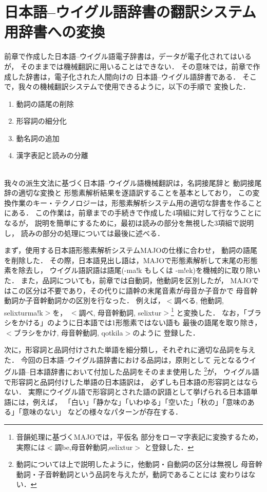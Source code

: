 {\section{日本語--ウイグル語辞書の翻訳システム用辞書への変換}\label{section:for_majo}
前章で作成した日本語--ウイグル語電子辞書は，データが電子化されてはいるが，
そのままでは機械翻訳に用いることはできない．
その意味では，前章で作成した辞書は，電子化された人間向けの
日本語--ウイグル語辞書である．
そこで，我々の機械翻訳システムで使用できるように，以下の手順で
変換した．\\

\begin{enumerate}
 \item 動詞の語尾の削除
 \item 形容詞の細分化
 \item 動名詞の追加
 \item 漢字表記と読みの分離
\end{enumerate} \mbox{} \\

我々の派生文法に基づく日本語--ウイグル語機械翻訳\cite{MT_SUMMIT2001}は，名詞接尾辞と
動詞接尾辞の適切な変換\cite{MUH_OGA2001,MAJO}と
形態素解析結果を逐語訳することを基本としており，
この変換作業のキー・テクノロジーは，形態素解析システム用の適切な辞書を作ることにある．
この作業は，前章までの手続きで作成した4項組に対して行なうことになるが，
説明を簡単にするために，最初は読みの部分を無視した3項組で説明し，
読みの部分の処理については最後に述べる．

まず，使用する日本語形態素解析システムMAJO\cite{MAJO}の仕様に合わせ，
動詞の語尾を削除した．
その際，日本語見出し語は，MAJOで形態素解析して末尾の形態素を除去し，
ウイグル語訳語は語尾(-ma!k もしくは -m!ek)を機械的に取り除いた．
また，品詞についても，前章では自動詞，他動詞を区別したが，
MAJOではこの区分は不要であり，その代りに語幹の末尾音素が母音か子音かで
母音幹動詞か子音幹動詞かの区別を行なった．
例えば，$<$調べる, 他動詞, selixturma!k$>$を，
$<$調べ, 母音幹動詞, selixtur$>$\footnote{音韻処理に基づくMAJOでは，平仮名
部分をローマ字表記に変換するため，実際には$<$調be,母音幹動詞,selixtur$>$
と登録した．}
と変換した．
なお，「ブラシをかける」のように日本語では1形態素ではない語も
最後の語尾を取り除き，$<$ブラシをかけ, 母音幹動詞, qotkila$>$のように
登録した．

次に，形容詞と品詞付けされた単語を細分類し，それぞれに適切な品詞を与えた．
今回の日本語--ウイグル語辞書における品詞は，原則として
元となるウイグル語--日本語辞書において付加した品詞をそのまま使用した
\footnote{動詞については上で説明したように，他動詞・自動詞の区分は無視し
母音幹動詞・子音幹動詞という品詞を与えたが，動詞であることには
変わりはない．}が，
ウイグル語で形容詞と品詞付けした単語の日本語訳は，
必ずしも日本語の形容詞とはならない．
実際にウイグル語で形容詞とされた語の訳語として挙げられる日本語単語には，例えば，
「白い」「静かな」「いわゆる」「空いた」「秋の」「意味のある」「意味のない」
などの様々なパターンが存在する．

}

